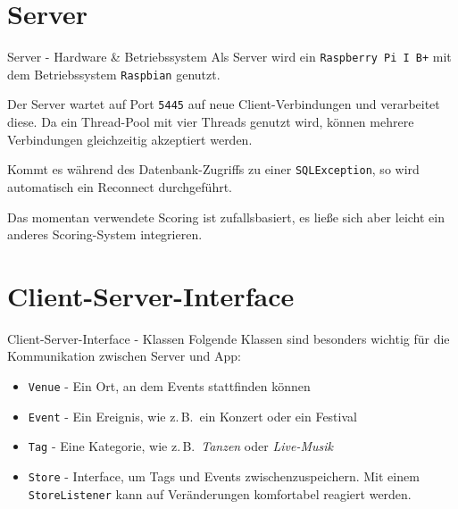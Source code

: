 \documentclass{beamer}
\begin{document}
	\section{Server}
	\begin{frame}{Server - Hardware \& Betriebssystem}
		Als Server wird ein \texttt{Raspberry Pi I B+} mit dem Betriebssystem \texttt{Raspbian} genutzt.
		
		Der Server wartet auf Port \texttt{5445} auf neue Client-Verbindungen und verarbeitet diese. Da ein \alert{Thread-Pool} mit vier Threads genutzt wird, können mehrere Verbindungen gleichzeitig akzeptiert werden.\pause
		
		Kommt es während des Datenbank-Zugriffs zu einer \texttt{SQLException}, so wird automatisch ein \alert{Reconnect} durchgeführt.\pause
		
		Das momentan verwendete \alert{Scoring} ist zufallsbasiert, es ließe sich aber leicht ein anderes Scoring-System integrieren.
	\end{frame}
	
	\section{Client-Server-Interface}
	\begin{frame}{Client-Server-Interface - Klassen}
		Folgende Klassen sind besonders wichtig für die Kommunikation zwischen Server und App:
		\begin{itemize}
			\item \texttt{Venue} - Ein Ort, an dem Events stattfinden können
			\item \texttt{Event} - Ein Ereignis, wie z.\,B.\ ein Konzert oder ein Festival
			\item \texttt{Tag} - Eine Kategorie, wie z.\,B.\ \textit{Tanzen} oder \textit{Live-Musik}
			\item \texttt{Store} - Interface, um Tags und Events zwischenzuspeichern. Mit einem \texttt{StoreListener} kann auf Veränderungen komfortabel reagiert werden.
		\end{itemize}
	\end{frame}
	
	
\end{document}
